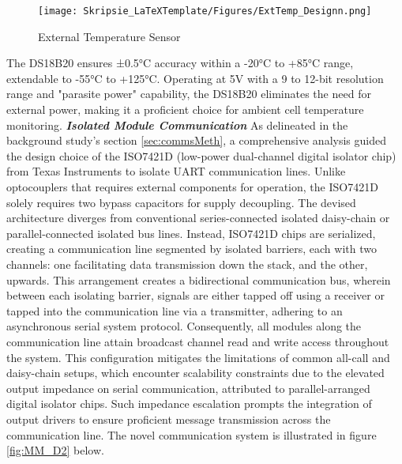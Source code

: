 \begin{figure}[h!]
\centering
\texttt{[image: Skripsie\_LaTeXTemplate/Figures/ExtTemp\_Designn.png]}
\caption{External Temperature Sensor \cite{TheExtTempSen}}
\label{fig:MM_D4}
\end{figure}
\noindent
The DS18B20 ensures ±0.5°C accuracy within a -20°C to +85°C range, extendable to -55°C to +125°C. Operating at 5V with a 9 to 12-bit resolution range and "parasite power" capability, the DS18B20 eliminates the need for external power, making it a proficient choice for ambient cell temperature monitoring.\newline\newline
\noindent
\textbf{\emph{Isolated Module Communication}}\label{subsubsec:iso_COMS}\newline
\noindent
As delineated in the background study's section \ref{sec:commsMeth}, a comprehensive analysis guided the design choice of the ISO7421D (low-power dual-channel digital isolator chip) from Texas Instruments \cite{isooooCHIP} to isolate UART communication lines. Unlike optocouplers that requires external components for operation, the ISO7421D solely requires two bypass capacitors for supply decoupling. The devised architecture diverges from conventional series-connected isolated daisy-chain or parallel-connected isolated bus lines. Instead, ISO7421D chips are serialized, creating a communication line segmented by isolated barriers, each with two channels: one facilitating data transmission down the stack, and the other, upwards.\newline\newline
\noindent
This arrangement creates a bidirectional communication bus, wherein between each isolating barrier, signals are either tapped off using a receiver or tapped into the communication line via a transmitter, adhering to an asynchronous serial system protocol. Consequently, all modules along the communication line attain broadcast channel read and write access throughout the system. This configuration mitigates the limitations of common all-call and daisy-chain setups, which encounter scalability constraints due to the elevated output impedance on serial communication, attributed to parallel-arranged digital isolator chips. Such impedance escalation prompts the integration of output drivers to ensure proficient message transmission across the communication line. The novel communication system is illustrated in figure \ref{fig:MM_D2} below.

